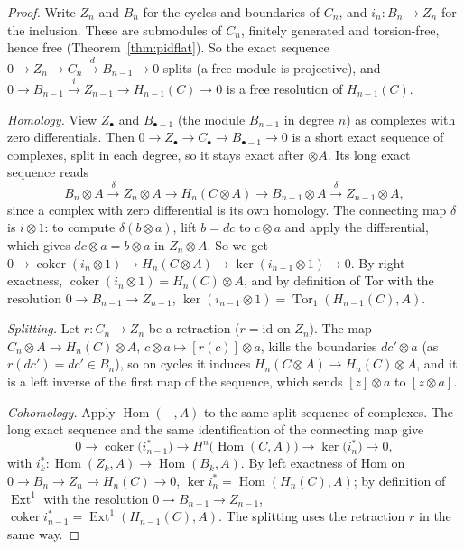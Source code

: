 \begin{proof}
Write $Z_n$ and $B_n$ for the cycles and boundaries of $C_n$, and $i_n\colon B_n\to Z_n$ for the inclusion. These are submodules of $C_n$, finitely generated and torsion-free, hence free (Theorem~\ref{thm:pidflat}). So the exact
sequence $0\to Z_n\to C_n\xrightarrow dB_{n-1}\to0$ splits (a free module is projective), and $0\to B_{n-1}\xrightarrow{i}Z_{n-1}\to H_{n-1}(C)\to0$ is a free resolution of $H_{n-1}(C)$.

\emph{Homology.} View $Z_\bullet$ and $B_{\bullet-1}$ (the module $B_{n-1}$ in degree $n$) as complexes with zero differentials. Then $0\to Z_\bullet\to C_\bullet\to B_{\bullet-1}\to0$ is a short exact sequence of complexes, split in each
degree, so it stays exact after $\otimes A$. Its long exact sequence reads
\[
B_n\otimes A\xrightarrow{\ \delta\ }Z_n\otimes A\to H_n(C\otimes A)\to B_{n-1}\otimes A\xrightarrow{\ \delta\ }Z_{n-1}\otimes A,
\]
since a complex with zero differential is its own homology. The connecting map $\delta$ is $i\otimes1$: to compute $\delta(b\otimes a)$, lift $b=dc$ to $c\otimes a$ and apply the differential, which gives $dc\otimes a=b\otimes a$ in
$Z_n\otimes A$. So we get $0\to\operatorname{coker}(i_n\otimes1)\to H_n(C\otimes A)\to\ker(i_{n-1}\otimes1)\to0$. By right exactness, $\operatorname{coker}(i_n\otimes1)=H_n(C)\otimes A$, and by definition of Tor with the
resolution $0\to B_{n-1}\to Z_{n-1}$, $\ker(i_{n-1}\otimes1)=\operatorname{Tor}_1(H_{n-1}(C),A)$.

\emph{Splitting.} Let $r\colon C_n\to Z_n$ be a retraction ($r=\mathrm{id}$ on $Z_n$). The map $C_n\otimes A\to H_n(C)\otimes A$, $c\otimes a\mapsto[r(c)]\otimes a$, kills the boundaries $dc'\otimes a$ (as $r(dc')=dc'\in B_n$), so on cycles
it induces $H_n(C\otimes A)\to H_n(C)\otimes A$, and it is a left inverse of the first map of the sequence, which sends $[z]\otimes a$ to $[z\otimes a]$.

\emph{Cohomology.} Apply $\operatorname{Hom}(-,A)$ to the same split sequence of complexes. The long exact sequence and the same identification of the connecting map give
\[
0\to\operatorname{coker}\bigl(i_{n-1}^*\bigr)\to H^n\bigl(\operatorname{Hom}(C,A)\bigr)\to\ker\bigl(i_n^*\bigr)\to0,
\]
with $i_k^*\colon\operatorname{Hom}(Z_k,A)\to\operatorname{Hom}(B_k,A)$. By left exactness of Hom on $0\to B_n\to Z_n\to H_n(C)\to0$, $\ker i_n^*=\operatorname{Hom}(H_n(C),A)$; by definition of $\operatorname{Ext}^1$ with the
resolution $0\to B_{n-1}\to Z_{n-1}$, $\operatorname{coker}i_{n-1}^*=\operatorname{Ext}^1(H_{n-1}(C),A)$. The splitting uses the retraction $r$ in the same way.
\end{proof}

